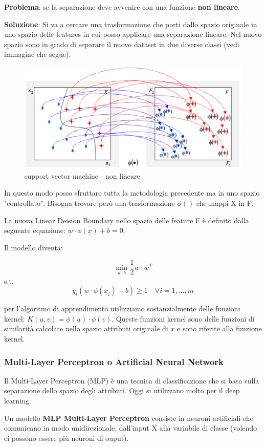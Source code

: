 \textbf{Problema}: se la separazione deve avvenire con una funzione \textbf{non lineare}.
 
\textbf{Soluzione}: Si va a cercare una trasformazione che porti dallo spazio originale in uno spazio delle features in cui posso applicare una separazione lineare. Nel nuovo spazio sono in grado di separare il nuovo dataset in due diverse classi (vedi immagine che segue). 

\begin{figure}[H]
	\hspace{-0.5cm}
	\includegraphics[height=0.45 \linewidth]{classification/pict/svm_nonlinear.png}
	\caption{support vector machine - non lineare}
\end{figure}

In questo modo posso sfruttare tutta la metodologia precedente ma in uno spazio "controllato". Bisogna trovare però una trasformazione $\phi()$ che mappi X in F.

La nuova Linear Deision Boundary nello spazio delle feature F è definito dalla seguente equazione: $\underline{w} \cdot \phi(\underline{x}) + b = 0$. 

Il modello diventa:

\[ \min_{\underline{w},b} \frac{1}{2}\underline{w} \cdot \underline{w}^T \]
\qquad s.t.
\[ y_i (\underline{w} \cdot \phi(\underline{x}_i) + b) \ge 1 \quad \forall i = 1, ..., m\]

per l'algoritmo di apprendimento utilizziamo sostanzialmente delle funzioni kernel: $K(\underline{u}, \underline{v}) = \phi(\underline{u}) \cdot \phi(\underline{v})$. Queste funzioni kernel sono delle funzioni di similarit\`a calcolate nello spazio attributi originale di $x$ e sono riferite alla funzione kernel.

\subsubsection{Multi-Layer Perceptron o Artificial Neural Network}
Il Multi-Layer Perceptron (MLP) è una tecnica di classificazione che si basa sulla separazione dello spazio degli attributi. Oggi si utilizzano molto per il deep learning.
\begin{defn}
	Un modello \textbf{MLP Multi-Layer Perceptron} consiste in neuroni artificiali che comunicano in modo unidirezionale, dall'input X alla variabile di classe (volendo ci possono essere pi\`u neuroni di ouput).
\end{defn}

